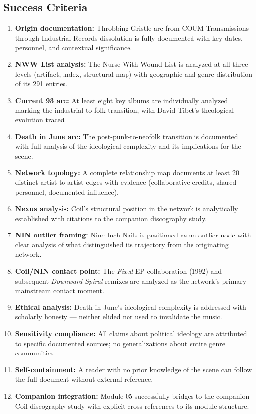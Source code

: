 \documentclass[11pt,letterpaper]{article}
\begin{document}
\subsection{Success Criteria}

\begin{enumerate}
  \item \textbf{Origin documentation:} Throbbing Gristle arc from COUM Transmissions through
    Industrial Records dissolution is fully documented with key dates, personnel, and
    contextual significance.
  \item \textbf{NWW List analysis:} The Nurse With Wound List is analyzed at all three levels
    (artifact, index, structural map) with geographic and genre distribution of its 291 entries.
  \item \textbf{Current 93 arc:} At least eight key albums are individually analyzed marking
    the industrial-to-folk transition, with David Tibet's theological evolution traced.
  \item \textbf{Death in June arc:} The post-punk-to-neofolk transition is documented with
    full analysis of the ideological complexity and its implications for the scene.
  \item \textbf{Network topology:} A complete relationship map documents at least 20 distinct
    artist-to-artist edges with evidence (collaborative credits, shared personnel, documented
    influence).
  \item \textbf{Nexus analysis:} Coil's structural position in the network is analytically
    established with citations to the companion discography study.
  \item \textbf{NIN outlier framing:} Nine Inch Nails is positioned as an outlier node with
    clear analysis of what distinguished its trajectory from the originating network.
  \item \textbf{Coil/NIN contact point:} The \textit{Fixed} EP collaboration (1992) and
    subsequent \textit{Downward Spiral} remixes are analyzed as the network's primary
    mainstream contact moment.
  \item \textbf{Ethical analysis:} Death in June's ideological complexity is addressed with
    scholarly honesty — neither elided nor used to invalidate the music.
  \item \textbf{Sensitivity compliance:} All claims about political ideology are attributed
    to specific documented sources; no generalizations about entire genre communities.
  \item \textbf{Self-containment:} A reader with no prior knowledge of the scene can follow
    the full document without external reference.
  \item \textbf{Companion integration:} Module 05 successfully bridges to the companion
    Coil discography study with explicit cross-references to its module structure.
\end{enumerate}
\end{document}
